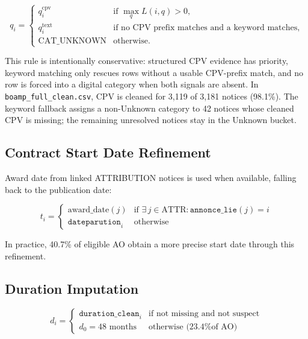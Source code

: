 \documentclass[12pt, a4paper]{article}
\begin{document}
\begin{equation}
  q_i =
  \begin{cases}
    q_i^{\text{cpv}} & \text{if } \max_q L(i,q)>0,\\
    q_i^{\text{text}} & \text{if no CPV prefix matches and a keyword matches},\\
    \text{CAT\_UNKNOWN} & \text{otherwise.}
  \end{cases}
\end{equation}

\noindent This rule is intentionally conservative: structured CPV evidence has
priority, keyword matching only rescues rows without a usable CPV-prefix match,
and no row is forced into a digital category when both signals are absent. In
\texttt{boamp\_full\_clean.csv}, CPV is cleaned for 3{,}119 of 3{,}181 notices
(98.1\%). The keyword fallback assigns a non-Unknown category to 42 notices
whose cleaned CPV is missing; the remaining unresolved notices stay in the
Unknown bucket.

\subsection{Contract Start Date Refinement}

Award date from linked ATTRIBUTION notices is used when available, falling
back to the publication date:

\begin{equation}
  t_i =
  \begin{cases}
    \text{award\_date}(j) & \text{if } \exists\, j \in \text{ATTR} : \texttt{annonce\_lie}(j) = i \\
    \texttt{dateparution}_i & \text{otherwise}
  \end{cases}
\end{equation}

In practice, 40.7\% of eligible AO obtain a more precise start date through
this refinement.

\subsection{Duration Imputation}

\begin{equation}
  d_i =
  \begin{cases}
    \texttt{duration\_clean}_i & \text{if not missing and not suspect} \\
    d_0 = 48 \text{ months}    & \text{otherwise (23.4\% of AO)}
  \end{cases}
\end{equation}
\end{document}
